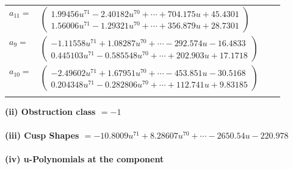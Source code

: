 \documentclass[1p]{elsarticle_modified}
\theoremstyle{definition}
\begin{document}
\begin{tabular}{m{7pt} m{180pt} m{7pt} m{180pt} }
\flushright $a_{11}=$&$\begin{pmatrix}1.99456 u^{71}-2.40182 u^{70}+\cdots+704.175 u+45.4301\\1.56006 u^{71}-1.29321 u^{70}+\cdots+356.879 u+28.7301\end{pmatrix}$ \\
\flushright $a_{9}=$&$\begin{pmatrix}-1.11558 u^{71}+1.08287 u^{70}+\cdots-292.574 u-16.4833\\0.445103 u^{71}-0.585548 u^{70}+\cdots+202.903 u+17.1718\end{pmatrix}$ \\
\flushright $a_{10}=$&$\begin{pmatrix}-2.49602 u^{71}+1.67951 u^{70}+\cdots-453.851 u-30.5168\\0.204348 u^{71}-0.282806 u^{70}+\cdots+112.741 u+9.83185\end{pmatrix}$\\&\end{tabular}
\flushleft \textbf{(ii) Obstruction class $= -1$}\\~\\
\flushleft \textbf{(iii) Cusp Shapes $= -10.8009 u^{71}+8.28607 u^{70}+\cdots-2650.54 u-220.978$}\\~\\
\newpage\renewcommand{\arraystretch}{1}
\flushleft \textbf{(iv) u-Polynomials at the component}\newline \\
\end{document}
